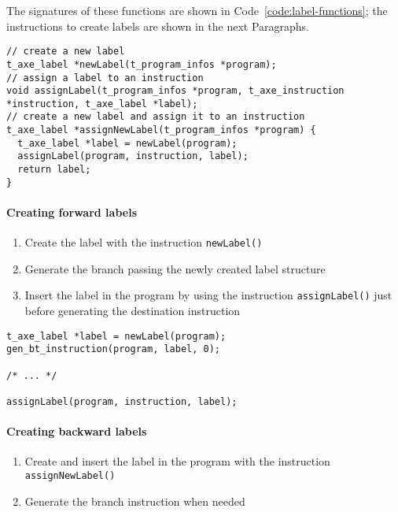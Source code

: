 The signatures of these functions are shown in Code~\ref{code:label-functions};
the instructions to create labels are shown in the next Paragraphs.

\begin{onepage}
  \begin{lstlisting}[language=LANCE, caption={Label functions}, label={code:label-functions}]
// create a new label
t_axe_label *newLabel(t_program_infos *program);
// assign a label to an instruction
void assignLabel(t_program_infos *program, t_axe_instruction *instruction, t_axe_label *label);
// create a new label and assign it to an instruction
t_axe_label *assignNewLabel(t_program_infos *program) {
  t_axe_label *label = newLabel(program);
  assignLabel(program, instruction, label);
  return label;
}
\end{lstlisting}
\end{onepage}

\paragraph*{Creating forward labels}

\begin{enumerate}
  \item Create the label with the instruction \texttt{newLabel()}
  \item Generate the branch passing the newly created label structure
  \item Insert the label in the program by using the instruction \texttt{assignLabel()} just before generating the destination instruction
\end{enumerate}

\begin{onepage}
  \begin{lstlisting}[language=LANCE, caption={Creating forward labels}, label={code:forward-labels}]
t_axe_label *label = newLabel(program);
gen_bt_instruction(program, label, 0);

/* ... */

assignLabel(program, instruction, label);
\end{lstlisting}
\end{onepage}

\paragraph*{Creating backward labels}

\begin{enumerate}
  \item Create and insert the label in the program with the instruction \texttt{assignNewLabel()}
  \item Generate the branch instruction when needed
\end{enumerate}

